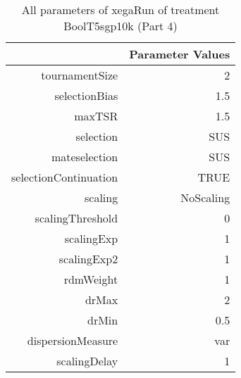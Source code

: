 \begin{table}[ht]
\centering
\begin{tabular}{rr}
  \hline
 & Parameter Values \\ 
  \hline
tournamentSize & 2 \\ 
  selectionBias & 1.5 \\ 
  maxTSR & 1.5 \\ 
  selection & SUS \\ 
  mateselection & SUS \\ 
  selectionContinuation & TRUE \\ 
  scaling & NoScaling \\ 
  scalingThreshold & 0 \\ 
  scalingExp & 1 \\ 
  scalingExp2 & 1 \\ 
  rdmWeight & 1 \\ 
  drMax & 2 \\ 
  drMin & 0.5 \\ 
  dispersionMeasure & var \\ 
  scalingDelay & 1 \\ 
   \hline
\end{tabular}
\caption{ All parameters of xegaRun of treatment BoolT5sgp10k 
 (Part 4)} 
\end{table}
